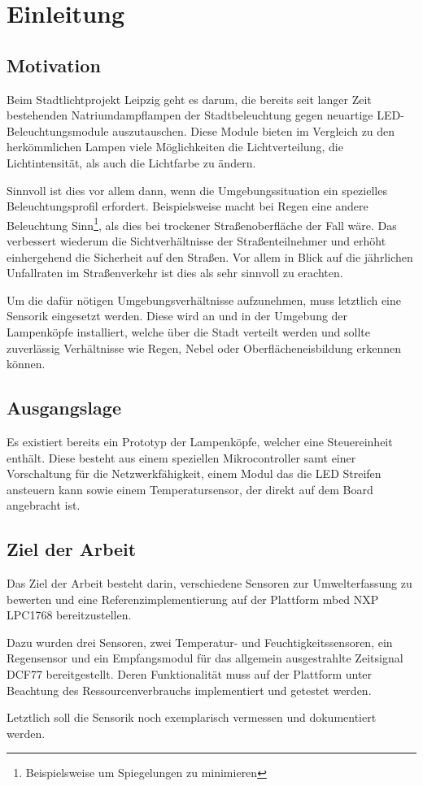 \chapter{Einleitung}
	\section{Motivation}
		Beim Stadtlichtprojekt Leipzig geht es darum, die bereits seit langer Zeit bestehenden Natriumdampflampen der Stadtbeleuchtung gegen neuartige LED-Beleuchtungsmodule auszutauschen. Diese Module bieten im Vergleich zu den herkömmlichen Lampen viele Möglichkeiten die Lichtverteilung, die Lichtintensität, als auch die Lichtfarbe zu ändern. 
		
		Sinnvoll ist dies vor allem dann, wenn die Umgebungssituation ein spezielles Beleuchtungsprofil erfordert. Beispielsweise macht bei Regen eine andere Beleuchtung Sinn\footnote{Beispielsweise um Spiegelungen zu minimieren}, als dies bei trockener Straßenoberfläche der Fall wäre. Das verbessert wiederum die Sichtverhältnisse der Straßenteilnehmer und erhöht einhergehend die Sicherheit auf den Straßen. Vor allem in Blick auf die jährlichen Unfallraten im Straßenverkehr ist dies als sehr sinnvoll zu erachten.
		
		Um die dafür nötigen Umgebungsverhältnisse aufzunehmen, muss letztlich eine Sensorik eingesetzt werden. Diese wird an und in der Umgebung der Lampenköpfe installiert, welche über die Stadt verteilt werden und sollte zuverlässig Verhältnisse wie Regen, Nebel oder Oberflächeneisbildung erkennen können.
		\newpage
	\section{Ausgangslage}
		Es existiert bereits ein Prototyp der Lampenköpfe, welcher eine Steuereinheit enthält. Diese besteht aus einem speziellen Mikrocontroller samt einer Vorschaltung für die Netzwerkfähigkeit, einem Modul das die LED Streifen ansteuern kann sowie einem Temperatursensor, der direkt auf dem Board angebracht ist.
	\section{Ziel der Arbeit}
		Das Ziel der Arbeit besteht darin, verschiedene Sensoren zur Umwelterfassung zu bewerten und eine Referenzimplementierung auf der Plattform mbed NXP LPC1768 bereitzustellen.
		
		Dazu wurden drei Sensoren, zwei Temperatur- und Feuchtigkeitssensoren, ein Regensensor und ein Empfangsmodul für das allgemein ausgestrahlte Zeitsignal DCF77 bereitgestellt. Deren Funktionalität muss auf der Plattform unter Beachtung des Ressourcenverbrauchs implementiert und getestet werden.
		
		Letztlich soll die Sensorik noch exemplarisch vermessen und dokumentiert werden.